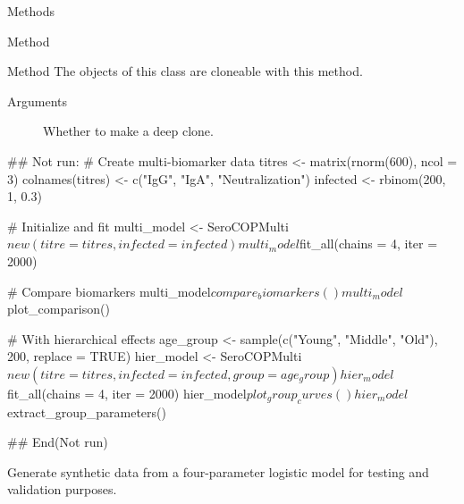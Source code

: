 \documentclass[a4paper]{book}
\begin{document}
\begin{Section}{Methods}
\begin{SubSection}{Method }
\end{SubSection}



\hypertarget{method-SeroCOPMulti-clone}{}
%
\begin{SubSection}{Method }
The objects of this class are cloneable with this method.
%


%
\begin{SubSubSection}{Arguments}

\begin{description}

\item[] Whether to make a deep clone.

\end{description}


\end{SubSubSection}

\end{SubSection}

\end{Section}
%
\begin{Examples}
\begin{ExampleCode}
## Not run: 
# Create multi-biomarker data
titres <- matrix(rnorm(600), ncol = 3)
colnames(titres) <- c("IgG", "IgA", "Neutralization")
infected <- rbinom(200, 1, 0.3)

# Initialize and fit
multi_model <- SeroCOPMulti$new(titre = titres, infected = infected)
multi_model$fit_all(chains = 4, iter = 2000)

# Compare biomarkers
multi_model$compare_biomarkers()
multi_model$plot_comparison()

# With hierarchical effects
age_group <- sample(c("Young", "Middle", "Old"), 200, replace = TRUE)
hier_model <- SeroCOPMulti$new(titre = titres, infected = infected, group = age_group)
hier_model$fit_all(chains = 4, iter = 2000)
hier_model$plot_group_curves()
hier_model$extract_group_parameters()

## End(Not run)
\end{ExampleCode}
\end{Examples}
%
\begin{Description}
Generate synthetic data from a four-parameter logistic model for testing
and validation purposes.
\end{Description}
\end{document}
